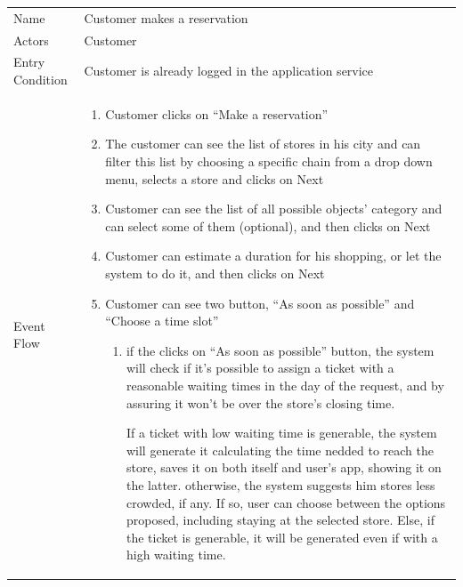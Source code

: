 \documentclass{article}
\newcommand\xrowht[2][0]
{\addstackgap[.5\dimexpr#2\relax]{\vphantom{#1}}}
\begin{document}
				\begin{center}
					
					
					\begin{adjustwidth}{-2.8cm}{}
					\begin{tabular}[h!]{|m{7.5em}|m{36em}|}
						
						\hline
						\xrowht{5pt}
						Name & Customer makes a reservation\\
						\xrowht{5pt}
						Actors & Customer\\
						\xrowht{5pt}
						Entry Condition & Customer is already logged in the application service\\
						\xrowht{5pt}
						Event Flow & \begin{enumerate}
							
							\itemsep-0.25em
							\item Customer clicks on “Make a reservation”
							\item The customer can see the list of stores in his city and can filter this list by choosing a specific chain from a drop down menu, selects a store and clicks on Next
							\item Customer can see the list of all possible objects’ category and can select some of them (optional), and then clicks on Next
							\item Customer can estimate a duration for his shopping, or let the system to do it, and then clicks on Next
							\item Customer can see two button, “As soon as possible” and “Choose a time slot”
							 
							\begin{enumerate}
								
								\itemsep-0.25em
								\item if the clicks on “As soon as possible” button, the system will check if it's possible to assign a ticket with a reasonable waiting times in the day of the request, and by assuring it won't be over the store's closing time.
								

									
									
									 If a ticket with low waiting time is generable, the system will generate it calculating the time nedded to reach the store, saves it on both itself and user's app, showing it on the latter.
									 otherwise, the system suggests him stores less crowded, if any. If so, user can choose between the options proposed, including staying at the selected store. Else, if the ticket is generable, it will be generated even if with a high waiting time.
									


\end{enumerate}
\end{enumerate}
\end{tabular}
\end{adjustwidth}
\end{center}
\end{document}
